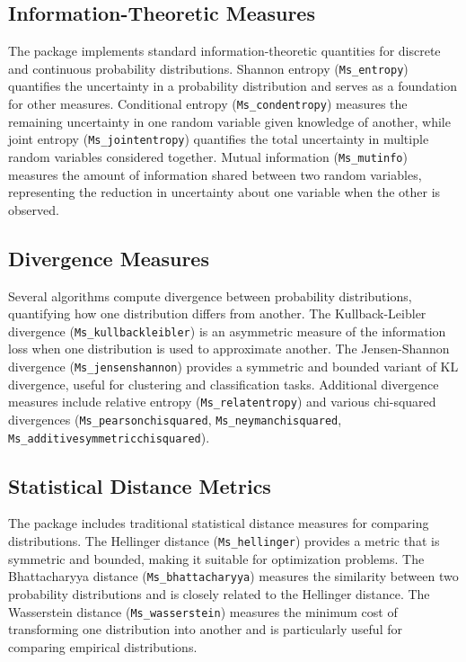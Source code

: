 \subsection{Information-Theoretic Measures}

The package implements standard information-theoretic quantities for discrete and continuous probability distributions. Shannon entropy (\texttt{Ms\_entropy}) quantifies the uncertainty in a probability distribution and serves as a foundation for other measures. Conditional entropy (\texttt{Ms\_condentropy}) measures the remaining uncertainty in one random variable given knowledge of another, while joint entropy (\texttt{Ms\_jointentropy}) quantifies the total uncertainty in multiple random variables considered together. Mutual information (\texttt{Ms\_mutinfo}) measures the amount of information shared between two random variables, representing the reduction in uncertainty about one variable when the other is observed.

\subsection{Divergence Measures}

Several algorithms compute divergence between probability distributions, quantifying how one distribution differs from another. The Kullback-Leibler divergence (\texttt{Ms\_kullbackleibler}) is an asymmetric measure of the information loss when one distribution is used to approximate another. The Jensen-Shannon divergence (\texttt{Ms\_jensenshannon}) provides a symmetric and bounded variant of KL divergence, useful for clustering and classification tasks. Additional divergence measures include relative entropy (\texttt{Ms\_relatentropy}) and various chi-squared divergences (\texttt{Ms\_pearsonchisquared}, \texttt{Ms\_neymanchisquared}, \texttt{Ms\_additivesymmetricchisquared}).

\subsection{Statistical Distance Metrics}

The package includes traditional statistical distance measures for comparing distributions. The Hellinger distance (\texttt{Ms\_hellinger}) provides a metric that is symmetric and bounded, making it suitable for optimization problems. The Bhattacharyya distance (\texttt{Ms\_bhattacharyya}) measures the similarity between two probability distributions and is closely related to the Hellinger distance. The Wasserstein distance (\texttt{Ms\_wasserstein}) measures the minimum cost of transforming one distribution into another and is particularly useful for comparing empirical distributions.

